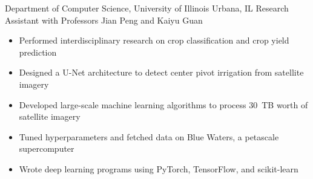 
        {Department of Computer Science, University of Illinois}
        {Urbana, IL}
        {Research Assistant}
        {with Professors Jian Peng and Kaiyu Guan}{
    \begin{itemize}
        \item Performed interdisciplinary research on crop classification and crop yield prediction
        \item Designed a U-Net architecture to detect center pivot irrigation from satellite imagery
        \item Developed large-scale machine learning algorithms to process 30~TB worth of satellite imagery
        \item Tuned hyperparameters and fetched data on Blue Waters, a petascale supercomputer
        \item Wrote deep learning programs using PyTorch, TensorFlow, and scikit-learn
    \end{itemize}
}
